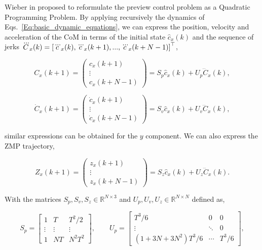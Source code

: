 Wieber in \citep{WieberHumanoids2006} proposed to reformulate the preview control problem as a Quadratic Programming Problem. By applying recursively the dynamics of Eqs.~\ref{Eq:basic_dynamic_equations}, we can express the position, velocity and acceleration  of the CoM in terms of the initial state $\hat{c}_x(k)$ and the sequence of jerks $\dddot{ C}_x(k) = \left[ \dddot{c}_x(k), \dddot{c}_x(k+1),...,\dddot{c}_x(k+N-1) \right]^{\top}$,

\begin{equation}
 \label{Eq:PosCMHorizon}
 {C}_x(k+1) = \left(
 \begin{matrix}
  c_x(k+1) \\
  \vdots \\
  c_x(k+N-1)
 \end{matrix}
 \right) = {S}_p \hat{c}_x(k) + { U}_p \dddot{C}_x(k),
\end{equation}

\begin{equation}
 \label{Eq:VelCMHorizon}
 \dot{C}_x(k+1) = \left(
 \begin{matrix}
  \dot{c}_x(k+1) \\
  \vdots \\
  \dot{c}_x(k+N-1)
 \end{matrix}
 \right) = {S}_v \hat{c}_x(k) + { U}_v \dddot{ C}_x(k),
\end{equation}

similar expressions can be obtained for the $y$ component. We can also express the ZMP trajectory,

\begin{equation}
 \label{Eq:PosZMPHorizon}
 { Z}_x(k+1) = \left(
 \begin{matrix}
  {z}_x(k+1) \\
  \vdots \\
  {z}_x(k+N-1)
 \end{matrix}
 \right) = { S}_z \hat{c}_x(k) + { U}_z \dddot{ C}_x(k).
\end{equation} 

With the matrices $S_p, S_v, S_z \in \mathbb{R}^{N\times3}$ and $U_p, U_v , U_z \in \mathbb{R}^{N \times N}$ defined as,

\begin{equation*}
  S_{p}=\begin{bmatrix} 1 & T & T^2/2 \\ \vdots & \vdots & \vdots \\ 1 & NT & N^2T^2 \end{bmatrix}, \qquad
  U_{p}=\begin{bmatrix} T^3/6 & 0 & 0 \\ \vdots & \ddots & 0 \\ (1+3N+3N^2)T^3/6 & \cdots & T^3/6 \end{bmatrix},
\end{equation*}

